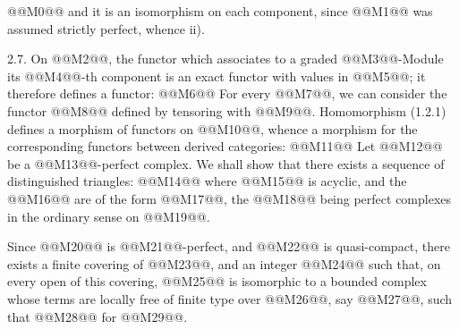 @@M0@@
and it is an isomorphism on each component, since @@M1@@ was assumed strictly perfect, whence ii).

2.7. On @@M2@@, the functor which associates to a graded @@M3@@-Module its @@M4@@-th component is an exact functor with values in @@M5@@; it therefore defines a functor:
@@M6@@
For every @@M7@@, we can consider the functor @@M8@@ defined by tensoring with @@M9@@. Homomorphism (1.2.1) defines a morphism of functors on @@M10@@, whence a morphism for the corresponding functors between derived categories:
@@M11@@
Let @@M12@@ be a @@M13@@-perfect complex. We shall show that there exists a sequence of distinguished triangles:
@@M14@@
where @@M15@@ is acyclic, and the @@M16@@ are of the form @@M17@@, the @@M18@@ being perfect complexes in the ordinary sense on @@M19@@.

Since @@M20@@ is @@M21@@-perfect, and @@M22@@ is quasi-compact, there exists a finite covering of @@M23@@, and an integer @@M24@@ such that, on every open of this covering, @@M25@@ is isomorphic to a bounded complex whose terms are locally free of finite type over @@M26@@, say @@M27@@, such that @@M28@@ for @@M29@@.

